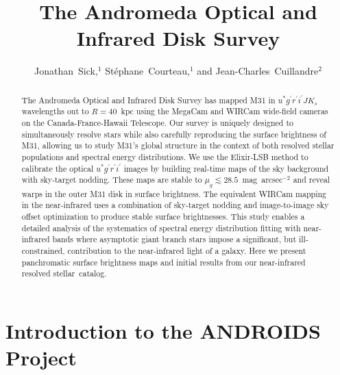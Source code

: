 \documentclass[11pt,twoside]{article}
\begin{document}
\title{The Andromeda Optical and Infrared Disk Survey}
\author{Jonathan~Sick,$^1$ St\'{e}phane~Courteau,$^1$ and Jean-Charles~Cuillandre$^2$}

\begin{abstract}
The Andromeda Optical and Infrared Disk Survey has mapped M31 in $u^* g^\prime r^\prime i^\prime J K_s$ wavelengths out to $R=40$~kpc using the MegaCam and WIRCam wide-field cameras on the Canada-France-Hawaii Telescope.
Our survey is uniquely designed to simultaneously resolve stars while also carefully reproducing the surface brightness of M31, allowing us to study M31's global structure in the context of both resolved stellar populations and spectral energy distributions.
We use the Elixir-LSB method to calibrate the optical $u^* g^\prime r^\prime i^\prime$ images by building real-time maps of the sky background with sky-target nodding.
These maps are stable to $\mu_g \lesssim 28.5$~mag~arcsec$^{-2}$ and reveal warps in the outer M31 disk in surface brightness.
The equivalent WIRCam mapping in the near-infrared uses a combination of sky-target nodding and image-to-image sky offset optimization to produce stable surface brightnesses.
This study enables a detailed analysis of the systematics of spectral energy distribution fitting with near-infrared bands where asymptotic giant branch stars impose a significant, but ill-constrained, contribution to the near-infrared light of a galaxy.
Here we present panchromatic surface brightness maps and initial results from our near-infrared resolved stellar~catalog.
\end{abstract}

\section{Introduction to the ANDROIDS Project}
\end{document}
